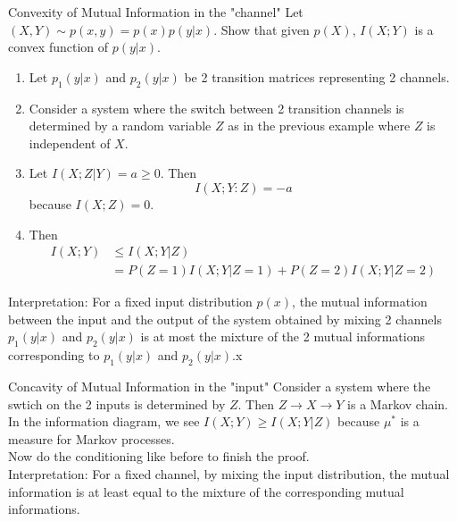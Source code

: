 \documentclass[../main.tex]{subfiles}
\begin{document}
\begin{pbox}{Convexity of Mutual Information in the "channel"}
Let $(X,Y)\sim p(x,y)=p(x)p(y|x)$. Show that given $p(X)$, $I(X;Y)$ is a convex function of $p(y|x)$.
\begin{enumerate}
    \item Let $p_1(y|x)$ and $p_2(y|x)$ be 2 transition matrices representing 2 channels.
    \item Consider a system where the switch between 2 transition channels is determined by a random variable $Z$ as in the previous example where $Z$ is independent of $X$.
    \item Let $I(X;Z|Y)=a\geq 0$. Then \begin{equation*}
        I(X;Y:Z)=-a
    \end{equation*} because $I(X;Z)=0$.
    \item Then \begin{align*}
        I(X;Y)&\leq I(X;Y|Z)\\
        &= P(Z=1)I(X;Y|Z=1)+P(Z=2)I(X;Y|Z=2)
    \end{align*}
\end{enumerate}
Interpretation: For a fixed input distribution $p(x)$, the mutual information between the input and the output of the system obtained by mixing 2 channels $p_1(y|x)$ and $p_2(y|x)$ is at most the mixture of the 2 mutual informations corresponding to $p_1(y|x)$ and $p_2(y|x)$.x
\end{pbox}
\begin{pbox}{Concavity of Mutual Information in the "input"}
    Consider a system where the swtich on the 2 inputs is determined by $Z$. Then $Z\to X\to Y$ is a Markov chain.\\
    In the information diagram, we see $I(X;Y)\geq I(X;Y|Z)$ because $\mu^*$ is a measure for Markov processes.\\
    Now do the conditioning like before to finish the proof.\\
    Interpretation: For a fixed channel, by mixing the input distribution, the mutual information is at least equal to the mixture of the corresponding mutual informations.
\end{pbox}
\end{document}
